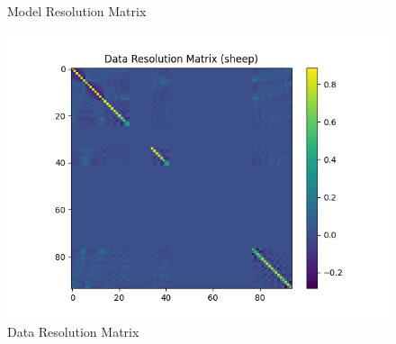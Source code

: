 \documentclass{article}
\begin{document}
\begin{itemize}
\begin{figure}[h]
    \caption{Model Resolution Matrix}
\end{figure}
\begin{figure}[h]
    \centering
    \includegraphics[width=1\textwidth]{images/outputs/datares/sheep.png}
    \caption{Data Resolution Matrix}
\end{figure}
\clearpage



\end{itemize}
\end{document}
